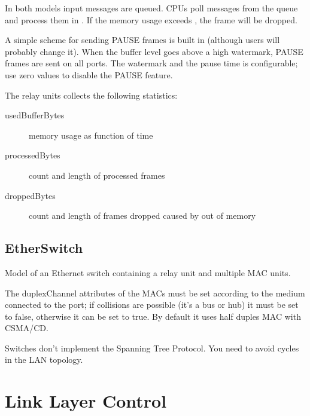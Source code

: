 In both models input messages are queued. CPUs poll messages from the queue
and process them in . If the memory usage exceeds
, the frame will be dropped.

A simple scheme for sending PAUSE frames is built in (although
users will probably change it). When the buffer level goes
above a high watermark, PAUSE frames are sent on all ports.
The watermark and the pause time is configurable; use zero
values to disable the PAUSE feature.


The relay units collects the following statistics:

\begin{description}
\item[usedBufferBytes] memory usage as function of time
\item[processedBytes] count and length of processed frames
\item[droppedBytes] count and length of frames dropped caused by out of memory
\end{description}


\subsection{EtherSwitch}

Model of an Ethernet switch containing a relay unit and multiple MAC units.

The duplexChannel attributes of the MACs must be set according to the
medium connected to the port; if collisions are possible (it's a bus or hub)
it must be set to false, otherwise it can be set to true.
By default it uses half duples MAC with CSMA/CD.

\begin{note}
Switches don't implement the Spanning Tree Protocol. You need to
avoid cycles in the LAN topology.
\end{note}

\section{Link Layer Control}
\label{sec:LLC}

